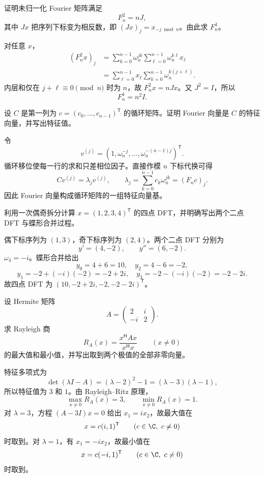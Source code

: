 \begin{exercise}[level=advanced]
证明未归一化 Fourier 矩阵满足
\[
F_n^2=nJ,
\]
其中 $Jx$ 把序列下标变为相反数，即 $(Jx)_j=x_{-j\bmod n}$。由此求 $F_n^4$。
\begin{solution}
对任意 $x$，
\begin{align*}
(F_n^2x)_j
&=\sum_{k=0}^{n-1}\omega_n^{jk}
\sum_{\ell=0}^{n-1}\omega_n^{k\ell}x_\ell\\
&=\sum_{\ell=0}^{n-1}x_\ell
\sum_{k=0}^{n-1}\omega_n^{k(j+\ell)}.
\end{align*}
内层和仅在 $j+\ell\equiv0\pmod n$ 时为 $n$，故
$F_n^2x=nJx$。又 $J^2=I$，所以
\[
F_n^4=n^2I.
\]
\end{solution}
\end{exercise}

\begin{exercise}[level=advanced]
设 $C$ 是第一列为 $c=(c_0,\ldots,c_{n-1})^{\mathsf T}$ 的循环矩阵。证明 Fourier 向量是 $C$ 的特征向量，并写出特征值。
\begin{solution}
令
\[
v^{(j)}=(1,\omega_n^{-j},\ldots,\omega_n^{-(n-1)j})^{\mathsf T}.
\]
循环移位使每一行的求和只差相位因子。直接作模 $n$ 下标代换可得
\[
Cv^{(j)}=\lambda_jv^{(j)},
\qquad
\lambda_j=\sum_{k=0}^{n-1}c_k\omega_n^{jk}=(F_nc)_j.
\]
因此 Fourier 向量构成循环矩阵的一组特征向量基。
\end{solution}
\end{exercise}

\begin{exercise}[level=advanced]
利用一次偶奇拆分计算 $x=(1,2,3,4)^{\mathsf T}$ 的四点 DFT，并明确写出两个二点 DFT 与蝶形合并过程。
\begin{solution}
偶下标序列为 $(1,3)$，奇下标序列为 $(2,4)$。两个二点 DFT 分别为
\[
y'=(4,-2),
\qquad
y''=(6,-2).
\]
$\omega_4=-i$。蝶形合并给出
\[
y_0=4+6=10,
\quad y_2=4-6=-2,
\]
\[
y_1=-2+(-i)(-2)=-2+2i,
\quad y_3=-2-(-i)(-2)=-2-2i.
\]
故四点 DFT 为
$(10,-2+2i,-2,-2-2i)^{\mathsf T}$。
\end{solution}
\end{exercise}

\begin{exercise}[level=advanced]
设 Hermite 矩阵
\[
A=\begin{pmatrix}2&i\\-i&2\end{pmatrix}.
\]
求 Rayleigh 商
\[
R_A(x)=\frac{x^{\mathsf H}Ax}{x^{\mathsf H}x}\qquad(x\ne0)
\]
的最大值和最小值，并写出取到两个极值的全部非零向量。
\begin{solution}
特征多项式为
\[
\det(\lambda I-A)
=(\lambda-2)^2-1=(\lambda-3)(\lambda-1),
\]
所以特征值为 $3$ 和 $1$。由 Rayleigh--Ritz 原理，
\[
\max_{x\ne0}R_A(x)=3,
\qquad
\min_{x\ne0}R_A(x)=1.
\]
对 $\lambda=3$，方程 $(A-3I)x=0$ 给出 $x_1=ix_2$，故最大值在
\[
x=c(i,1)^{\mathsf T}\qquad(c\in\C,\ c\ne0)
\]
时取到。对 $\lambda=1$，有 $x_1=-ix_2$，故最小值在
\[
x=c(-i,1)^{\mathsf T}\qquad(c\in\C,\ c\ne0)
\]
时取到。
\end{solution}
\end{exercise}

